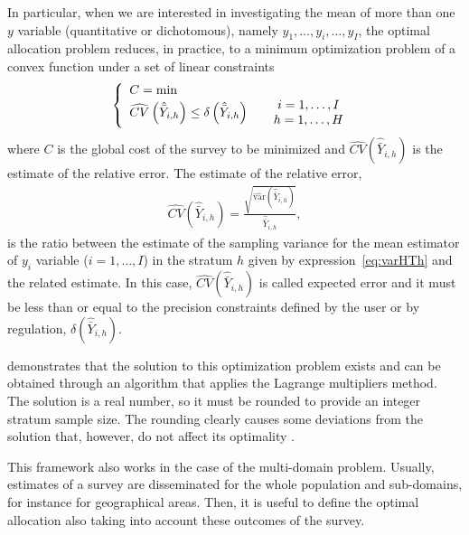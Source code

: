 In particular, when we are interested in investigating the mean of more than one $y$ variable (quantitative or dichotomous), namely $y_1, \dots, y_i, \dots, y_I$, the optimal allocation problem reduces, in practice, to a minimum optimization problem of a convex function under a set of linear constraints
\begin{eqnarray}
	\label{eq:optprob}
	\left\lbrace
	\begin{array}{l}
		C = \text{min} \\
		\widehat{CV} \left(\hat{\bar{Y}}_{i,h}\right) \leq 
		\delta \left(\hat{\bar{Y}}_{i,h} \right)
		\hspace{0.5cm} \begin{array}{c}
			i = 1, \dots, I \\
			h = 1, \dots, H 
		\end{array}
	\end{array}
	\right.
\end{eqnarray}
where $C$ is the global cost of the survey to be minimized and $\hat{CV} \left(\hat{\bar{Y}}_{i,h}\right)$ is the estimate of the relative error. 
The estimate of the relative error,
\begin{eqnarray}
	\label{eq:CVHTh}
	\widehat{CV} \left(\hat{\bar{Y}}_{i,h} \right) = \frac{\sqrt{\widehat{\text{var}} \left(\hat{\bar{Y}}_{i,h} \right)}}{\hat{\bar{Y}}_{i,h}}, 
\end{eqnarray}
is the ratio between the estimate of the sampling variance for the mean estimator of $y_i$ variable ($i=1, \dots, I$) in  the stratum $h$ given by expression~\eqref{eq:varHTh} and the related estimate.
In this case, $\widehat{CV} \left(\hat{\bar{Y}}_{i,h}\right)$ is called
expected error and it must be less than or equal to the precision constraints defined by the user or by regulation, $\delta \left(\hat{\bar{Y}}_{i,h} \right)$.

\cite{bethel1989sample} demonstrates that the solution to this optimization problem exists and can be obtained through an algorithm that applies the Lagrange multipliers method.
The solution is a real number, so it must be rounded to provide an integer stratum sample size.
The rounding clearly causes some deviations from the solution that, however, do not affect its optimality \citep{cochran1977sampling}.

This framework also works in the case of the multi-domain problem.
Usually, estimates of a survey are disseminated for
the whole population and sub-domains, for instance for geographical areas.
Then, it is useful to define the optimal allocation also taking into account these outcomes of the survey.


